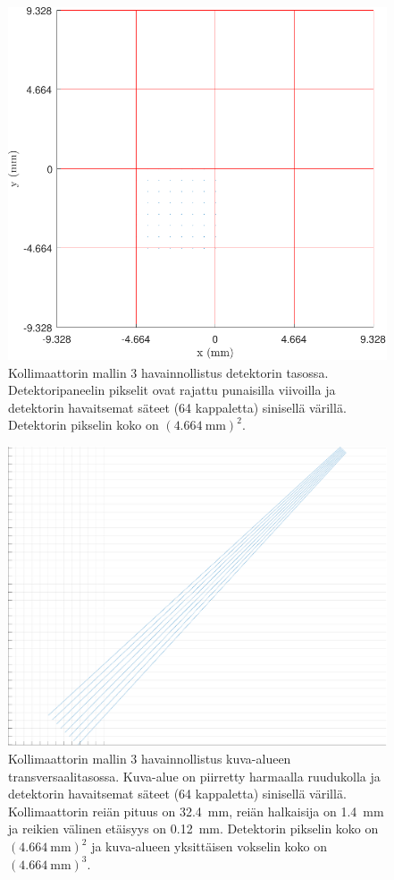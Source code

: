 \begin{figure}[H]
    \centering
    \captionsetup{width=.9\linewidth}
    \includegraphics[width=.9\linewidth]{kuvat/malli3_2D.pdf}
    \caption{Kollimaattorin mallin 3 havainnollistus detektorin tasossa. Detektoripaneelin pikselit ovat rajattu punaisilla viivoilla ja detektorin havaitsemat säteet (64 kappaletta) sinisellä värillä. Detektorin pikselin koko on $(\qty{4.664}{\milli\meter})^2$.}
    \label{fig:ray3_2D}
\end{figure}
\begin{figure}[H]
    \centering
    \captionsetup{width=.9\linewidth}
    \includegraphics[width=.9\linewidth]{kuvat/malli3_3D.pdf}
    \caption{Kollimaattorin mallin 3 havainnollistus kuva-alueen transversaalitasossa. Kuva-alue on piirretty harmaalla ruudukolla ja detektorin havaitsemat säteet (64 kappaletta) sinisellä värillä. Kollimaattorin reiän pituus on \qty{32.4}{\milli\meter}, reiän halkaisija on \qty{1.4}{\milli\meter} ja reikien välinen etäisyys on \qty{0.12}{\milli\meter}. Detektorin pikselin koko on $(\qty{4.664}{\milli\meter})^2$ ja kuva-alueen yksittäisen vokselin koko on $(\qty{4.664}{\milli\meter})^{3}$.}
    \label{fig:ray3_3D}
\end{figure}

